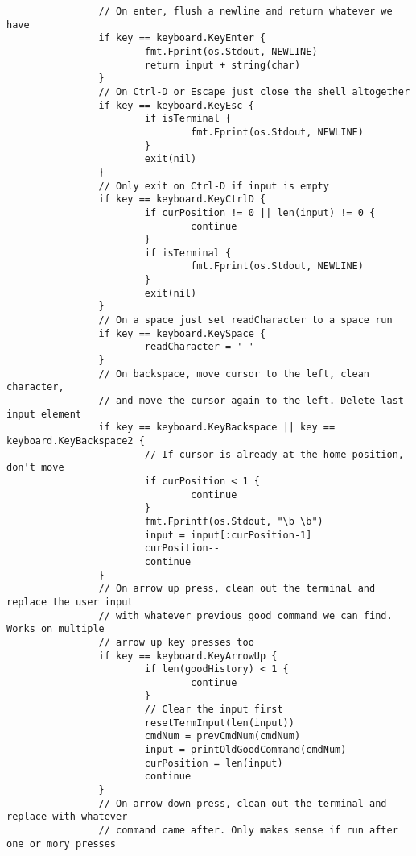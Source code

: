 \documentclass[12pt]{article}
\begin{document}
\begin{verbatim}
                // On enter, flush a newline and return whatever we have
                if key == keyboard.KeyEnter {
                        fmt.Fprint(os.Stdout, NEWLINE)
                        return input + string(char)
                }
                // On Ctrl-D or Escape just close the shell altogether
                if key == keyboard.KeyEsc {
                        if isTerminal {
                                fmt.Fprint(os.Stdout, NEWLINE)
                        }
                        exit(nil)
                }
                // Only exit on Ctrl-D if input is empty
                if key == keyboard.KeyCtrlD {
                        if curPosition != 0 || len(input) != 0 {
                                continue
                        }
                        if isTerminal {
                                fmt.Fprint(os.Stdout, NEWLINE)
                        }
                        exit(nil)
                }
                // On a space just set readCharacter to a space run
                if key == keyboard.KeySpace {
                        readCharacter = ' '
                }
                // On backspace, move cursor to the left, clean character,
                // and move the cursor again to the left. Delete last input element
                if key == keyboard.KeyBackspace || key == keyboard.KeyBackspace2 {
                        // If cursor is already at the home position, don't move
                        if curPosition < 1 {
                                continue
                        }
                        fmt.Fprintf(os.Stdout, "\b \b")
                        input = input[:curPosition-1]
                        curPosition--
                        continue
                }
                // On arrow up press, clean out the terminal and replace the user input
                // with whatever previous good command we can find. Works on multiple
                // arrow up key presses too
                if key == keyboard.KeyArrowUp {
                        if len(goodHistory) < 1 {
                                continue
                        }
                        // Clear the input first
                        resetTermInput(len(input))
                        cmdNum = prevCmdNum(cmdNum)
                        input = printOldGoodCommand(cmdNum)
                        curPosition = len(input)
                        continue
                }
                // On arrow down press, clean out the terminal and replace with whatever
                // command came after. Only makes sense if run after one or mory presses

\end{verbatim}
\end{document}
